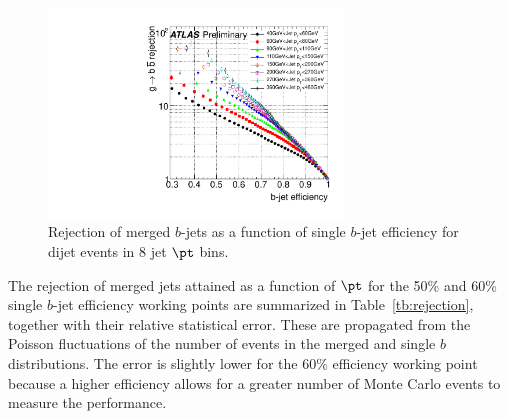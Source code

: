 \begin{figure}[tp]
\centering
\includegraphics[width=0.7\textwidth]{FIGS/Likelihood/KDE_RejvsEff.pdf}
\caption{Rejection of merged $b$-jets as a function of single $b$-jet efficiency for dijet events in 8 jet $\pt$ bins.}
\label{fig:performanceinbins}
\end{figure}


The rejection of merged jets attained as a function of $\pt$ for the 50\% and 60\% single $b$-jet efficiency working points are summarized in Table~\ref{tb:rejection}, together with their relative statistical error. These are propagated from the Poisson fluctuations of the number of events in the merged and single $b$ distributions. The error is slightly lower for the 60\% efficiency working point because a higher efficiency allows for a greater number of Monte Carlo events to measure the performance. %




